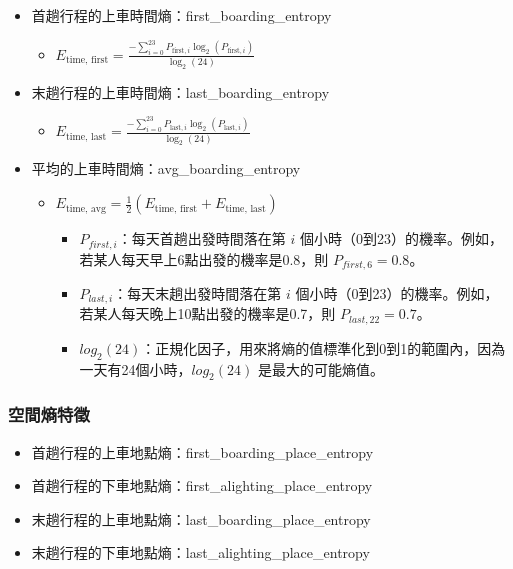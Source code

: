 \begin{itemize}
\tightlist
\item
  首趟行程的上車時間熵：first\_boarding\_entropy

  \begin{itemize}
  \tightlist
  \item
    \(E_{\text{time, first}} = \frac{ -\sum_{i=0}^{23} P_{\text{first}, i} \log_2(P_{\text{first}, i}) }{ \log_2(24) }\)
  \end{itemize}
\item
  末趟行程的上車時間熵：last\_boarding\_entropy

  \begin{itemize}
  \tightlist
  \item
    \(E_{\text{time, last}} = \frac{ -\sum_{i=0}^{23} P_{\text{last}, i} \log_2(P_{\text{last}, i}) }{ \log_2(24) }\)
  \end{itemize}
\item
  平均的上車時間熵：avg\_boarding\_entropy

  \begin{itemize}
  \tightlist
  \item
    \(E_{\text{time, avg}} = \frac{1}{2} \left( E_{\text{time, first}} + E_{\text{time, last}} \right)\)

    \begin{itemize}
    \tightlist
    \item
      \(P_{first,i​}\)：每天首趟出發時間落在第 \(i\)
      個小時（0到23）的機率。例如，若某人每天早上6點出發的機率是0.8，則
      \(P_{first,6}=0.8\)。
    \item
      \(P_{last,i​}\)：每天末趟出發時間落在第 \(i\)
      個小時（0到23）的機率。例如，若某人每天晚上10點出發的機率是0.7，則
      \(P_{last,22}=0.7\)。
    \item
      \(log_2​(24)\)：正規化因子，用來將熵的值標準化到0到1的範圍內，因為一天有24個小時，\(log_2​(24)\)
      是最大的可能熵值。
    \end{itemize}
  \end{itemize}
\end{itemize}

\subsubsection{空間熵特徵}\label{ux7a7aux9593ux71b5ux7279ux5fb5}

\begin{itemize}
\tightlist
\item
  首趟行程的上車地點熵：first\_boarding\_place\_entropy
\item
  首趟行程的下車地點熵：first\_alighting\_place\_entropy
\item
  末趟行程的上車地點熵：last\_boarding\_place\_entropy
\item
  末趟行程的下車地點熵：last\_alighting\_place\_entropy
\end{itemize}


